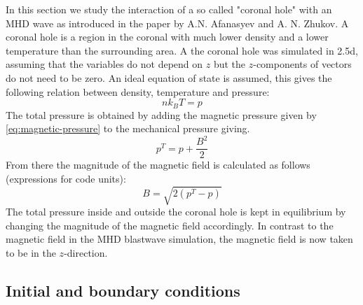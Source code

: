 In this section we study the interaction of a so called "coronal hole" with an MHD wave as introduced in the paper \cite{coronal-hole} by A.N. Afanasyev and A. N. Zhukov. 
A coronal hole is a region in the coronal with much lower density and a lower temperature than the surrounding area.
A the coronal hole was simulated in 2.5d, assuming that the variables do not depend on $z$ but the $z$-components of vectors do not need to be zero.
An ideal equation of state is assumed, this gives the following relation between density, temperature and pressure:
\begin{equation}
	nk_BT = p
	\label{eq:ideal-gas}
\end{equation}
The total pressure is obtained by adding the magnetic pressure given by \cref{eq:magnetic-pressure} to the mechanical pressure giving.
\begin{equation*}
	p^T = p + \frac{B^2}{2}
\end{equation*}
From there the magnitude of the magnetic field is calculated as follows (expressions for code units):
\begin{equation}
	B = \sqrt{2 \left( p^T-p \right) }
	\label{eq:magnetic-magnitude}
\end{equation}
The total pressure inside and outside the coronal hole is kept in equilibrium by changing the magnitude of the magnetic field accordingly.
In contrast to the magnetic field in the MHD blastwave simulation, the magnetic field is now taken to be in the $z$-direction.

\subsection{Initial and boundary conditions}

